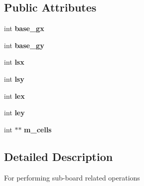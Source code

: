 \subsection*{\-Public \-Attributes}
\begin{DoxyCompactItemize}
\item 
\hypertarget{classknight__path__t_1_1k__sub__board__t_a5e2e779a4d361192ff05356c645e8cc9}{int {\bfseries base\-\_\-gx}}\label{classknight__path__t_1_1k__sub__board__t_a5e2e779a4d361192ff05356c645e8cc9}

\item 
\hypertarget{classknight__path__t_1_1k__sub__board__t_a8993336472921368d8bda8a98c05a1f5}{int {\bfseries base\-\_\-gy}}\label{classknight__path__t_1_1k__sub__board__t_a8993336472921368d8bda8a98c05a1f5}

\item 
\hypertarget{classknight__path__t_1_1k__sub__board__t_a108e685e82ea8a1f8c294d729680ada1}{int {\bfseries lsx}}\label{classknight__path__t_1_1k__sub__board__t_a108e685e82ea8a1f8c294d729680ada1}

\item 
\hypertarget{classknight__path__t_1_1k__sub__board__t_a3e59562256f539cdb716f285ca2dbb1a}{int {\bfseries lsy}}\label{classknight__path__t_1_1k__sub__board__t_a3e59562256f539cdb716f285ca2dbb1a}

\item 
\hypertarget{classknight__path__t_1_1k__sub__board__t_a95a4a65e0eadef271e8ae5dea2c35fef}{int {\bfseries lex}}\label{classknight__path__t_1_1k__sub__board__t_a95a4a65e0eadef271e8ae5dea2c35fef}

\item 
\hypertarget{classknight__path__t_1_1k__sub__board__t_a8f565ff7dd0a502dcfa77cb437a4cb5a}{int {\bfseries ley}}\label{classknight__path__t_1_1k__sub__board__t_a8f565ff7dd0a502dcfa77cb437a4cb5a}

\item 
\hypertarget{classknight__path__t_1_1k__sub__board__t_a4cbc055f2d09c3e279199716fd70e399}{int $\ast$$\ast$ {\bfseries m\-\_\-cells}}\label{classknight__path__t_1_1k__sub__board__t_a4cbc055f2d09c3e279199716fd70e399}

\end{DoxyCompactItemize}


\subsection{\-Detailed \-Description}
\-For performing sub-\/board related operations 

